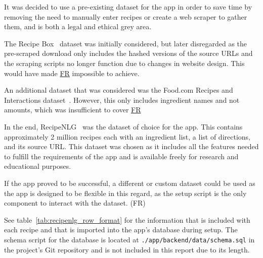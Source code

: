 It was decided to use a pre-existing dataset for the app in order to save time by removing the need to manually enter recipes
or create a web scraper to gather them, and is both a legal and ethical grey area.~\cite{murray_state_university_legality_2020}

The Recipe Box~\cite{lee_recipe_2017} dataset was initially considered, but later disregarded as the pre-scraped download only includes the
hashed versions of the source URLs and the scraping scripts no longer function due to changes in website design. This would have made
\hyperref[req:sources]{FR} impossible to achieve.

An additional dataset that was considered was the Food.com Recipes and Interactions dataset~\cite{li_foodcom_2019}. However, this only includes
ingredient names and not amounts, which was insufficient to cover \hyperref[req:track_amounts]{FR}

In the end, RecipeNLG~\cite{bien_recipenlg_2020} was the dataset of choice for the \chef{} app. This contains approximately 2 million recipes
each with an ingredient list, a list of directions, and its source URL. This dataset was chosen as it includes all the features needed to
fulfill the requirements of the app and is available freely for research and educational purposes.

If the app proved to be successful, a different or custom dataset could be used as the app is designed
to be flexible in this regard, as the setup script is the only component to interact with the dataset. (FR)

See table~\ref{tab:recipenlg_row_format} for the information that is included with each recipe and that is imported into
the app's database during setup. The schema script for the database is located at \texttt{./app/backend/data/schema.sql}
in the project's Git repository and is not included in this report due to its length.

